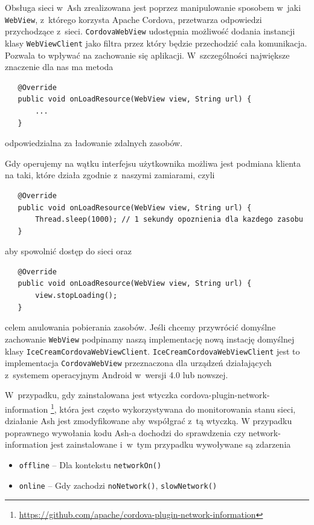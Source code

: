 \documentclass[brudnopis]{xmgr}
\begin{document}
Obsługa sieci w~Ash zrealizowana jest poprzez manipulowanie sposobem w~jaki \texttt{WebView}, z~którego korzysta Apache Cordova, przetwarza odpowiedzi przychodzące z~sieci. \texttt{CordovaWebView} udostępnia możliwość dodania instancji klasy \texttt{WebViewClient} jako filtra przez który będzie przechodzić cała komunikacja. Pozwala to wpływać na zachowanie się aplikacji. W~szczególności największe znaczenie dla nas ma metoda

\begin{lstlisting}
   @Override
   public void onLoadResource(WebView view, String url) {
       ...
   }
\end{lstlisting}

odpowiedzialna za ładowanie zdalnych zasobów.

Gdy operujemy na wątku interfejsu użytkownika możliwa jest podmiana klienta na taki, które działa zgodnie z~naszymi zamiarami, czyli 

\begin{lstlisting}
   @Override
   public void onLoadResource(WebView view, String url) {
       Thread.sleep(1000); // 1 sekundy opoznienia dla kazdego zasobu
   }
\end{lstlisting}

aby spowolnić dostęp do sieci oraz

\begin{lstlisting}
   @Override
   public void onLoadResource(WebView view, String url) {
       view.stopLoading();
   }
\end{lstlisting}

celem anulowania pobierania zasobów. Jeśli chcemy przywrócić domyślne zachowanie \texttt{WebView} podpinamy naszą implementację nową instację domyślnej klasy \texttt{IceCreamCordovaWebViewClient}. \texttt{IceCreamCordovaWebViewClient} jest to implementacja \texttt{CordovaWebView} przeznaczona dla urządzeń działających z~systemem operacyjnym Android w~wersji 4.0 lub nowszej.

W~przypadku, gdy zainstalowana jest wtyczka cordova-plugin-network-information \footnote{ \url{https://github.com/apache/cordova-plugin-network-information} }, która jest często wykorzystywana do monitorowania stanu sieci, działanie Ash jest zmodyfikowane aby współgrać z~tą wtyczką. W przypadku poprawnego wywołania kodu Ash-a dochodzi do sprawdzenia czy network-information jest zainstalowane i~w~tym przypadku wywoływane są zdarzenia

\begin{itemize}
  \item \texttt{offline} -- Dla kontekstu \texttt{networkOn()} 
  \item \texttt{online} -- Gdy zachodzi \texttt{noNetwork()}, \texttt{slowNetwork()}
\end{itemize}
\end{document}
